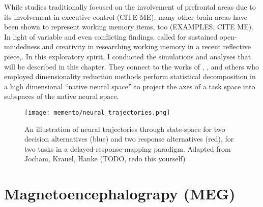 While studies traditionally focused on the involvement of prefrontal areas due to its involvement in executive control (CITE ME), many other brain areas have been shown to represent working memory items, too (EXAMPLES, CITE ME).
In light of variable and even conflicting findings, \citet{nobre2022opening} called for sustained open-mindedness and creativity in researching working memory in a recent reflective piece,.
In this exploratory spirit, I conducted the simulations and analyses that will be described in this chapter.
They connect to the works of \citet{murray2017stable}, \citet{machens2010functional}, \citet{rigotti2013importance} and others who employed dimensionality reduction methods perform statistical decomposition in a high dimensional ``native neural space'' to
project the axes of a task space into subspaces of the native neural space.






\begin{figure}
	\centering
	\texttt{[image: memento/neural\_trajectories.png]}
	\caption[Neural trajectories]{An illustration of neural trajectories through state-space for two decision alternatives (blue) and two response alternatives (red), for two tasks in a delayed-response-mapping paradigm.  Adapted from Jocham, Krauel, Hanke (TODO, redo this yourself)}
	\label{fig:trajectories}
\end{figure}


\section{Magnetoencephalograpy (MEG)}

